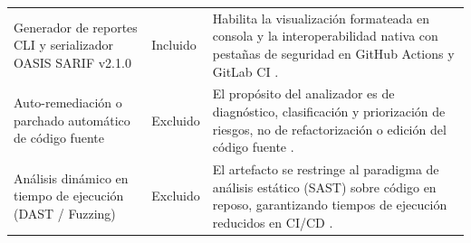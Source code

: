 \begin{table}[H]
\begin{tabularx}{\textwidth}{>{\raggedright\arraybackslash}p{4.8cm} >{\centering\arraybackslash}p{3.2cm} >{\raggedright\arraybackslash}X}
\addlinespace
Generador de reportes CLI y serializador OASIS SARIF v2.1.0 & Incluido & 
Habilita la visualización formateada en consola y la interoperabilidad nativa con pestañas de seguridad en GitHub Actions y GitLab CI \parencite{oasis2019sarif}. \\ %
\addlinespace
Auto-remediación o parchado automático de código fuente & Excluido & 
El propósito del analizador es de diagnóstico, clasificación y priorización de riesgos, no de refactorización o edición del código fuente \parencite{bogart2016break}. \\ %
\addlinespace
Análisis dinámico en tiempo de ejecución (DAST / Fuzzing) & Excluido & 
El artefacto se restringe al paradigma de análisis estático (SAST) sobre código en reposo, garantizando tiempos de ejecución reducidos en CI/CD \parencite{humble2010continuous}. \\ %
\bottomrule
\end{tabularx}
\end{table}

